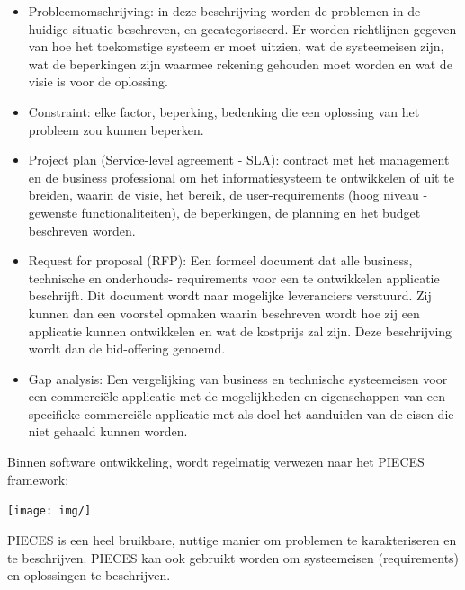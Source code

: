 \begin{itemize}
    \item Probleemomschrijving:
in deze beschrijving worden de problemen in de huidige situatie beschreven, en gecategoriseerd. Er worden richtlijnen gegeven van hoe het toekomstige systeem er moet uitzien, wat de systeemeisen zijn, wat de beperkingen zijn waarmee rekening gehouden moet worden en wat de visie is voor de oplossing.
    \item Constraint:
elke factor, beperking, bedenking die een oplossing van het probleem zou kunnen beperken.
    \item Project plan (Service-level agreement - SLA):
contract met het management en de business professional om het informatiesysteem te ontwikkelen of uit te breiden, waarin de visie, het bereik, de user-requirements (hoog niveau - gewenste functionaliteiten), de beperkingen, de planning en het budget beschreven worden.
\item Request for proposal (RFP):
Een formeel document dat alle business, technische en onderhouds- requirements voor een te ontwikkelen applicatie beschrijft. Dit document wordt naar mogelijke leveranciers verstuurd. Zij kunnen dan een voorstel opmaken waarin beschreven wordt hoe zij een applicatie kunnen ontwikkelen en wat de kostprijs zal zijn. Deze beschrijving wordt dan de bid-offering genoemd.
\item Gap analysis:
Een vergelijking van business en technische systeemeisen voor een commerciële applicatie met de mogelijkheden en eigenschappen van een specifieke commerciële applicatie met als doel het aanduiden van de eisen die niet gehaald kunnen worden.
\end{itemize}

Binnen software ontwikkeling, wordt regelmatig verwezen naar het PIECES framework:


\begin{center}
\texttt{[image: img/]}%
\label{labelname}%
\end{center}

PIECES is een heel bruikbare, nuttige manier om problemen te karakteriseren en te beschrijven. PIECES kan ook gebruikt worden om systeemeisen (requirements) en oplossingen te beschrijven.

